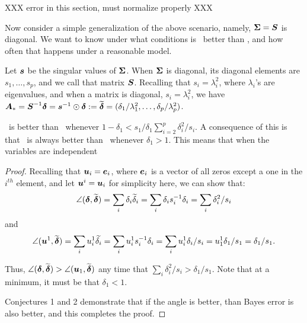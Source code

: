\documentclass[10pt]{article}
\begin{document}
XXX error in this section, must normalize properly XXX

Now consider a simple generalization of the above scenario, namely, $\boldsymbol{\Sigma}=\boldsymbol{S}$ is diagonal.
We want to know under what conditions is \Lol~better than \Pca, and how often that happens under a reasonable model.


Let $\boldsymbol{s}$ be the singular values of $\boldsymbol{\Sigma}$.  When $\boldsymbol{\Sigma}$ is diagonal, its diagonal elements are $s_1,\ldots,s_p$, and we call that matrix $\boldsymbol{S}$.
Recalling that $s_i=\lambda_i^2$, where $\lambda_i$'s are eigenvalues, and when a matrix is diagonal, $s_i=\lambda_i^2$, we have  $\boldsymbol{A}_*=\boldsymbol{S}^{-1} \boldsymbol{\delta}=\boldsymbol{s}^{-1} \odot \boldsymbol{\delta} := \widetilde{\boldsymbol{\delta}} =(\delta_1/\lambda_1^2,\ldots,\delta_p/\lambda_p^2)$.



\begin{lem}
\Lol~is better than \Pca~whenever $1-\delta_1 < {s_1}/{\delta_1} \sum_{i=2}^p {\delta_i^2}/{s_i}$.
A consequence of this is that \Lol~is always better than \Pca~whenever $\delta_1>1$.
This means that when the variables are independent
\end{lem}



\begin{proof}
Recalling that $\boldsymbol{u}_i=\boldsymbol{e}_i$, where $\boldsymbol{e}_i$ is a vector of all zeros except a one in the $i^{th}$ element, and let $\boldsymbol{u}^i=\boldsymbol{u}_i$ for simplicity here, we can show that:
$$
\angle(\boldsymbol{\delta},\widetilde{\boldsymbol{\delta}}) =
\sum_i \delta_i \widetilde{\delta}_i =
\sum_i \delta_i s^{-1}_i \delta_i =
\sum_i \delta_i^2 / s_i
$$
and
$$
\angle(\boldsymbol{u}^1, \widetilde{\boldsymbol{\delta}})  = \sum_i u^1_i \widetilde{\delta_i} =  \sum_i u^1_i s^{-1}_i {\delta_i}= \sum_i u^1_i {\delta_i} /s_i =  u^1_1 {\delta_1} /s_1=  {\delta_1} /s_1.
$$

Thus, $\angle(\boldsymbol{\delta},\widetilde{\boldsymbol{\delta}}) > \angle(\boldsymbol{u}_1, \widetilde{\boldsymbol{\delta}})$ any time that
$\sum_i \delta_i^2 / s_i > \delta_1 / s_1$.
Note that at a minimum, it must be that $\delta_1 < 1$.

Conjectures 1 and 2 demonstrate that if the angle is better, than Bayes error is also better, and this completes the proof.
\end{proof}

\end{document}
